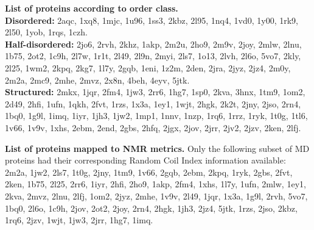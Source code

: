 \newpage

\begin{suppdata} \label{data:sup_data_constava:order_class_proteins}
\textbf{List of proteins according to order class.}\\

\noindent\textbf{Disordered:} 2aqc, 1xq8, 1mjc, 1u96, 1ss3, 2kbz, 2l95, 1nq4, 1vd0, 1y00, 1rk9, 2l50, 1yob, 1rqs, 1czh.\\
\textbf{Half-disordered:} 2jo6, 2rvh, 2khz, 1akp, 2m2u, 2ho9, 2m9v, 2joy, 2mlw, 2lnu, 1b75, 2ot2, 1c9h, 2l7w, 1r1t, 2l49, 2l9n, 2myi, 2ls7, 1o13, 2lvh, 2l6o, 5vo7, 2kly, 2l25, 1wm2, 2kpq, 2kg7, 1l7y, 2gqb, 1eni, 1z2m, 2den, 2jra, 2jyz, 2jz4, 2m0y, 2m2a, 2mc9, 2mhe, 2mvz, 2x8n, 4beh, 4eyv, 5jtk.\\
\textbf{Structured:} 2mkx, 1jqr, 2fm4, 1jw3, 2rr6, 1hg7, 1sp0, 2kva, 3hnx, 1tm9, 1om2, 2d49, 2hfi, 1ufn, 1qkh, 2fvt, 1rzs, 1x3a, 1ey1, 1wjt, 2hgk, 2k2t, 2jny, 2jso, 2rn4, 1bq0, 1g9l, 1imq, 1iyr, 1jh3, 1jw2, 1mp1, 1nnv, 1nzp, 1rq6, 1rrz, 1ryk, 1t0g, 1tl6, 1v66, 1v9v, 1xhs, 2ebm, 2end, 2gbs, 2hfq, 2jgx, 2jov, 2jrr, 2jv2, 2jzv, 2ken, 2lfj.
\end{suppdata}

\begin{suppdata} \label{data:sup_data_constava:prots_with_nmr_metrics}
\textbf{List of proteins mapped to NMR metrics.} Only the following subset of MD proteins had their corresponding Random Coil Index information available:\\

\noindent2m2a, 1jw2, 2ls7, 1t0g, 2jny, 1tm9, 1v66, 2gqb, 2ebm, 2kpq, 1ryk, 2gbs, 2fvt, 2ken, 1b75, 2l25, 2rr6, 1iyr, 2hfi, 2ho9, 1akp, 2fm4, 1xhs, 1l7y, 1ufn, 2mlw, 1ey1, 2kva, 2mvz, 2lnu, 2lfj, 1om2, 2jyz, 2mhe, 1v9v, 2l49, 1jqr, 1x3a, 1g9l, 2rvh, 5vo7, 1bq0, 2l6o, 1c9h, 2jov, 2ot2, 2joy, 2rn4, 2hgk, 1jh3, 2jz4, 5jtk, 1rzs, 2jso, 2kbz, 1rq6, 2jzv, 1wjt, 1jw3, 2jrr, 1hg7, 1imq.
\end{suppdata}